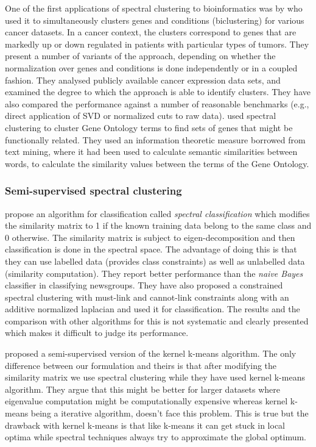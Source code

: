 One of the first applications of spectral clustering to bioinformatics was by \citet{kluger2003spectral} who used it to simultaneously clusters genes and conditions (biclustering) for various cancer datasets. In a cancer context, the clusters correspond to genes that are markedly up or down regulated in patients with particular types of tumors. They present a number of variants of the approach, depending on whether the normalization over genes and conditions is done independently or in a coupled fashion. They analysed publicly available cancer expression data sets, and examined the degree to which the approach is able to identify clusters. They have also compared the performance against a number of reasonable benchmarks (e.g., direct application of SVD or normalized cuts to raw data). \citet{speer05spectral} used spectral clustering to cluster Gene Ontology terms to find sets of genes that might be functionally related. They used an information theoretic measure borrowed from text mining, where it had been used to calculate semantic similarities between words, to calculate the similarity values between the terms of the Gene Ontology.

\subsubsection{Semi-supervised spectral clustering}
\citet{kamvar03spectral} propose an algorithm for classification called \textit{spectral classification} which modifies the similarity matrix to 1 if the known training data belong to the same class and 0 otherwise. The similarity matrix is subject to eigen-decomposition and then classification is done in the spectral space. The advantage of doing this is that they can use labelled data (provides class constraints) as well as unlabelled data (similarity computation). They report better performance than the \textit{naive Bayes} classifier in classifying newsgroups. They have also proposed a constrained spectral clustering with must-link and cannot-link constraints along with an additive normalized laplacian \citep{fiedler1975property} and used it for classification. The results and the comparison with other algorithms for this is not systematic and clearly presented which makes it difficult to judge its performance. 

\citet{brian_semisupgraph2005} proposed a semi-supervised version of the kernel k-means algorithm. The only difference between our formulation and theirs is that after modifying the similarity matrix we use spectral clustering while they have used kernel k-means algorithm. They argue that this might be better for larger datasets where eigenvalue computation might be computationally expensive whereas kernel k-means being a iterative algorithm, doesn't face this problem. This is true but the drawback with kernel k-means is that like k-means it can get stuck in local optima while spectral techniques always try to approximate the global optimum.

